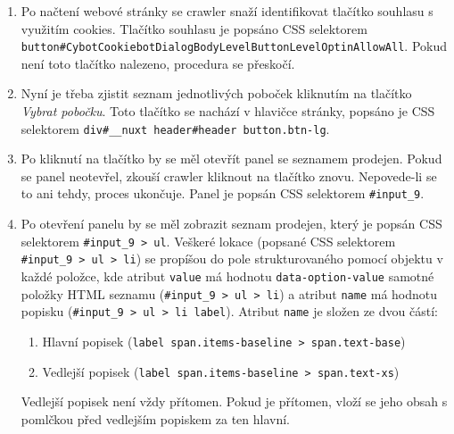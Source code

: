 \begin{enumerate}
    \item Po načtení webové stránky se crawler snaží identifikovat tlačítko
        souhlasu s využitím cookies. Tlačítko souhlasu je popsáno CSS selektorem\\
        \texttt{button\#CybotCookiebotDialogBodyLevelButtonLevelOptinAllowAll}.
        Pokud není toto tlačítko nalezeno, procedura se přeskočí.
    \item Nyní je třeba zjistit seznam jednotlivých poboček kliknutím na tlačítko
        \emph{Vybrat pobočku}. Toto tlačítko se nachází v hlavičce stránky,
        popsáno je CSS selektorem \texttt{div\#\_\_nuxt header\#header button.btn-lg}.
    \item Po kliknutí na tlačítko by se měl otevřít panel se seznamem prodejen.
        Pokud se panel neotevřel, zkouší crawler kliknout na tlačítko znovu.
        Nepovede-li se to ani tehdy, proces ukončuje. Panel je popsán CSS selektorem
        \texttt{\#input\_9}.
    \item Po otevření panelu by se měl zobrazit seznam prodejen, který je popsán
        CSS selektorem \texttt{\#input\_9 > ul}. Veškeré lokace (popsané CSS
        selektorem \texttt{\#input\_9 > ul > li}) se propíšou do pole strukturovaného
        pomocí objektu v každé položce, kde atribut \texttt{value} má hodnotu
        \texttt{data-option-value} samotné položky HTML seznamu
        (\texttt{\#input\_9 > ul > li}) a atribut \texttt{name} má hodnotu popisku
        (\texttt{\#input\_9 > ul > li label}). Atribut \texttt{name} je složen ze dvou
        částí:
        \begin{enumerate}
            \item Hlavní popisek
                (\texttt{label span.items-baseline > span.text-base})
            \item Vedlejší popisek
                (\texttt{label span.items-baseline > span.text-xs})
        \end{enumerate}
        Vedlejší popisek není vždy přítomen. Pokud je přítomen, vloží se jeho obsah
        s pomlčkou před vedlejším popiskem za ten hlavní.
        

\end{enumerate}

